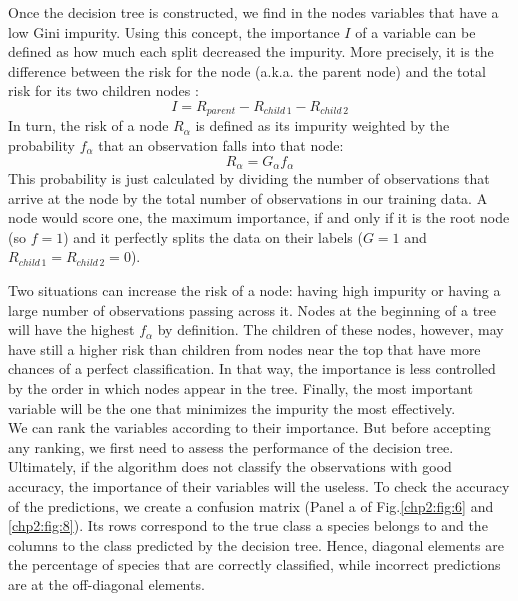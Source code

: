 Once the decision tree is constructed, we find in the nodes variables that have a low Gini impurity. Using this concept, the importance $I$ of a variable can be defined as how much each split decreased the impurity. More precisely, it is the difference between the risk for the node (a.k.a. the parent node) and the total risk for its two children nodes \cite{importance}:
\begin{equation}
    I = R_{parent} - R_{child\,1} - R_{child\,2}
    \label{eq:importance}
\end{equation}
In turn, the risk of a node $R_\alpha$ is defined as its impurity weighted by the probability $f_\alpha$ that an observation falls into that node:
\begin{equation}
    R_{\alpha} = G_\alpha f_\alpha
\end{equation}
This probability is just calculated by dividing the number of observations that arrive at the node by the total number of observations in our training data. A node would score one, the maximum importance, if and only if it is the root node (so $f = 1$) and it perfectly splits the data on their labels ($G = 1$ and $R_{child\,1} = R_{child\,2} = 0$). 

Two situations can increase the risk of a node: having high impurity or having a large number of observations passing across it. Nodes at the beginning of a tree will have the highest $f_\alpha$ by definition. The children of these nodes, however, may have still a higher risk than children from nodes near the top that have more chances of a perfect classification. In that way, the importance is less controlled by the order in which nodes appear in the tree. Finally, the most important variable will be the one that minimizes the impurity the most effectively. \\

We can rank the variables according to their importance. But before accepting any ranking, we first need to assess the performance of the decision tree. Ultimately, if the algorithm does not classify the observations with good accuracy, the importance of their variables will the useless. To check the accuracy of the predictions, we create a confusion matrix (Panel a of Fig.\ref{chp2:fig:6}  and \ref{chp2:fig:8}). Its rows correspond to the true class a species belongs to and the columns to the class predicted by the decision tree. Hence, diagonal elements are the percentage of species that are correctly classified, while incorrect predictions are at the off-diagonal elements. \\

